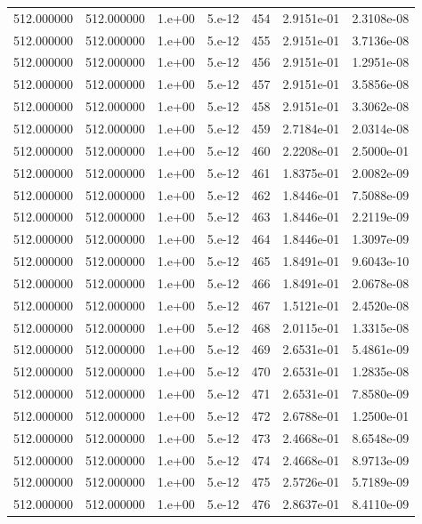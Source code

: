 \begin{table}[htbp]
\begin{tabular}{rrrrrrr}
512.000000 & 512.000000 & 1.e+00 & 5.e-12 & 454 & 2.9151e-01 & 2.3108e-08 \\
512.000000 & 512.000000 & 1.e+00 & 5.e-12 & 455 & 2.9151e-01 & 3.7136e-08 \\
512.000000 & 512.000000 & 1.e+00 & 5.e-12 & 456 & 2.9151e-01 & 1.2951e-08 \\
512.000000 & 512.000000 & 1.e+00 & 5.e-12 & 457 & 2.9151e-01 & 3.5856e-08 \\
512.000000 & 512.000000 & 1.e+00 & 5.e-12 & 458 & 2.9151e-01 & 3.3062e-08 \\
512.000000 & 512.000000 & 1.e+00 & 5.e-12 & 459 & 2.7184e-01 & 2.0314e-08 \\
512.000000 & 512.000000 & 1.e+00 & 5.e-12 & 460 & 2.2208e-01 & 2.5000e-01 \\
512.000000 & 512.000000 & 1.e+00 & 5.e-12 & 461 & 1.8375e-01 & 2.0082e-09 \\
512.000000 & 512.000000 & 1.e+00 & 5.e-12 & 462 & 1.8446e-01 & 7.5088e-09 \\
512.000000 & 512.000000 & 1.e+00 & 5.e-12 & 463 & 1.8446e-01 & 2.2119e-09 \\
512.000000 & 512.000000 & 1.e+00 & 5.e-12 & 464 & 1.8446e-01 & 1.3097e-09 \\
512.000000 & 512.000000 & 1.e+00 & 5.e-12 & 465 & 1.8491e-01 & 9.6043e-10 \\
512.000000 & 512.000000 & 1.e+00 & 5.e-12 & 466 & 1.8491e-01 & 2.0678e-08 \\
512.000000 & 512.000000 & 1.e+00 & 5.e-12 & 467 & 1.5121e-01 & 2.4520e-08 \\
512.000000 & 512.000000 & 1.e+00 & 5.e-12 & 468 & 2.0115e-01 & 1.3315e-08 \\
512.000000 & 512.000000 & 1.e+00 & 5.e-12 & 469 & 2.6531e-01 & 5.4861e-09 \\
512.000000 & 512.000000 & 1.e+00 & 5.e-12 & 470 & 2.6531e-01 & 1.2835e-08 \\
512.000000 & 512.000000 & 1.e+00 & 5.e-12 & 471 & 2.6531e-01 & 7.8580e-09 \\
512.000000 & 512.000000 & 1.e+00 & 5.e-12 & 472 & 2.6788e-01 & 1.2500e-01 \\
512.000000 & 512.000000 & 1.e+00 & 5.e-12 & 473 & 2.4668e-01 & 8.6548e-09 \\
512.000000 & 512.000000 & 1.e+00 & 5.e-12 & 474 & 2.4668e-01 & 8.9713e-09 \\
512.000000 & 512.000000 & 1.e+00 & 5.e-12 & 475 & 2.5726e-01 & 5.7189e-09 \\
512.000000 & 512.000000 & 1.e+00 & 5.e-12 & 476 & 2.8637e-01 & 8.4110e-09 \\

\end{tabular}
\end{table}
